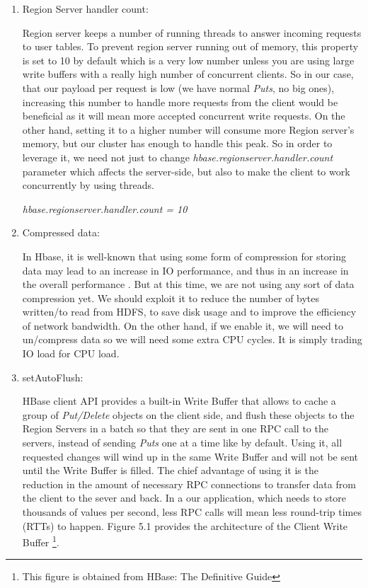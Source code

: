 \begin{enumerate}
\item{Region Server handler count:}
\par
Region server keeps a number of running threads to answer incoming requests to user tables. To prevent region server running out of memory, this property is set to 10 by default which is a very low number unless you are using large write buffers with a really high number of concurrent clients. So in our case, that our payload per request is low (we have normal \textit{Puts}, no big ones), increasing this number to handle more requests from the client would be beneficial as it will mean more accepted concurrent write requests. On the other hand, setting it to a higher number will consume more Region server's memory, but our cluster has enough to handle this peak. So in order to leverage it, we need not just to change \textit{hbase.regionserver.handler.count} parameter which affects the server-side, but also to make the client to work concurrently by using threads.

\bigskip

\centerline{\textit{hbase.regionserver.handler.count = 10}}
\bigskip
\item Compressed data:
\par
In Hbase, it is well-known that using some form of compression for storing data may lead to an increase in IO performance, and thus in an increase in the overall performance \cite{raichand2013short} \cite{cheng2013key} \cite{aiyer2012storage} \cite{ApacheHBaseCompression}. But at this time, we are not using any sort of data compression yet. We should exploit it to reduce the number of bytes written/to read from HDFS, to save disk usage and to improve the efficiency of network bandwidth. On the other hand, if we enable it, we will need to un/compress data so we will need some extra CPU cycles. It is simply trading IO load for CPU load.

 \bigskip

\item setAutoFlush:
\par
HBase client API provides a built-in Write Buffer that allows to cache a group of \textit{Put/Delete} objects on the client side, and flush these objects to the Region Servers in a batch so that they are sent in one RPC call to the servers, instead of sending \textit{Puts} one at a time like by default. Using it, all requested changes will wind up in the same Write Buffer and will not be sent until the Write Buffer is filled. The chief advantage of using it is the reduction in the amount of necessary RPC connections to transfer data from the client to the sever and back. In a our application, which needs to store thousands of values per second, less RPC calls will mean less round-trip times (RTTs) to happen. Figure 5.1 provides the architecture of the Client Write Buffer \footnote{This figure is obtained from HBase: The Definitive Guide}.


\end{enumerate}
